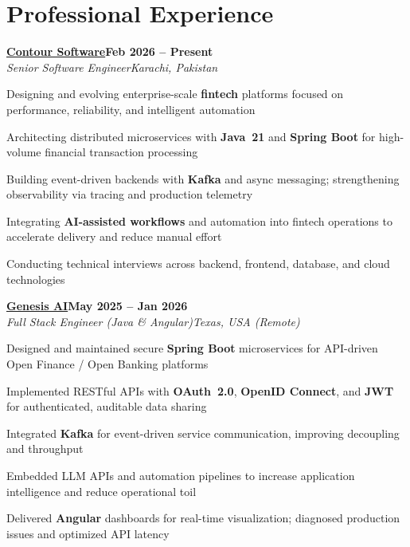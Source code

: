 \documentclass[letterpaper,10pt]{article}
\newcommand{\heading}[2]{
  \hspace{8pt}#1\hfill#2\\
}
\newcommand{\headingBf}[2]{
  \heading{\textbf{#1}}{\textbf{#2}}
}
\newcommand{\headingIt}[2]{
  \heading{\textit{#1}}{\textit{#2}}
}
\newenvironment{resume_list}{
  \vspace{-6pt}
  \begin{itemize}[itemsep=-1px, parsep=0.5pt, topsep=1pt, leftmargin=22pt]
}{
  \end{itemize}
  \vspace{-2pt}
}
\begin{document}
\section{Professional Experience}

\headingBf{\href{https://contour-software.com/}{Contour Software}}{Feb 2026 -- Present}
\headingIt{Senior Software Engineer}{Karachi, Pakistan}
\begin{resume_list}
  \item Designing and evolving enterprise-scale \textbf{fintech} platforms focused on performance, reliability, and intelligent automation
  \item Architecting distributed microservices with \textbf{Java~21} and \textbf{Spring Boot} for high-volume financial transaction processing
  \item Building event-driven backends with \textbf{Kafka} and async messaging; strengthening observability via tracing and production telemetry
  \item Integrating \textbf{AI-assisted workflows} and automation into fintech operations to accelerate delivery and reduce manual effort
  \item Conducting technical interviews across backend, frontend, database, and cloud technologies
\end{resume_list}

\vspace{2pt}
\headingBf{\href{https://www.linkedin.com/company/genesisaico/}{Genesis AI}}{May 2025 -- Jan 2026}
\headingIt{Full Stack Engineer (Java \& Angular)}{Texas, USA (Remote)}
\begin{resume_list}
  \item Designed and maintained secure \textbf{Spring Boot} microservices for API-driven Open Finance / Open Banking platforms
  \item Implemented RESTful APIs with \textbf{OAuth~2.0}, \textbf{OpenID Connect}, and \textbf{JWT} for authenticated, auditable data sharing
  \item Integrated \textbf{Kafka} for event-driven service communication, improving decoupling and throughput
  \item Embedded LLM APIs and automation pipelines to increase application intelligence and reduce operational toil
  \item Delivered \textbf{Angular} dashboards for real-time visualization; diagnosed production issues and optimized API latency
\end{resume_list}
\end{document}
